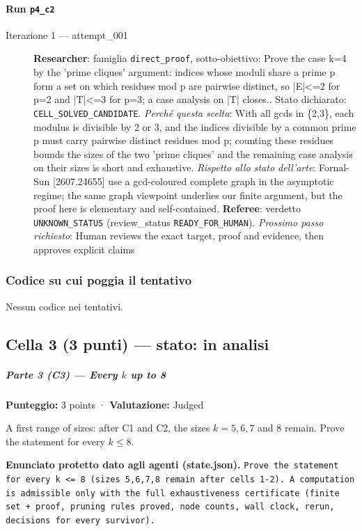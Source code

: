 \documentclass[11pt,a4paper]{article}
\begin{document}
\paragraph{Run \texttt{p4\_c2}}
\begin{description}
\item[Iterazione 1 — attempt\_001]
\textbf{Researcher}: famiglia \texttt{direct\_proof}, sotto-obiettivo: Prove the case k=4 by the 'prime cliques' argument: indices whose moduli share a prime p form a set on which residues mod p are pairwise distinct, so |E|\textless{}=2 for p=2 and |T|\textless{}=3 for p=3; a case analysis on |T| closes.. Stato dichiarato: \texttt{CELL\_SOLVED\_CANDIDATE}.
\emph{Perché questa scelta}: With all gcds in \{2,3\}, each modulus is divisible by 2 or 3, and the indices divisible by a common prime p must carry pairwise distinct residues mod p; counting these residues bounds the sizes of the two 'prime cliques' and the remaining case analysis on their sizes is short and exhaustive.
\emph{Rispetto allo stato dell'arte}: Fornal-Sun [2607.24655] use a gcd-coloured complete graph in the asymptotic regime; the same graph viewpoint underlies our finite argument, but the proof here is elementary and self-contained.
\textbf{Referee}: verdetto \texttt{UNKNOWN\_STATUS} (review\_status \texttt{READY\_FOR\_HUMAN}).
\emph{Prossimo passo richiesto}: Human reviews the exact target, proof and evidence, then approves explicit claims
\end{description}

\subsubsection{Codice su cui poggia il tentativo}
Nessun codice nei tentativi.

\subsection{Cella 3 (3 punti) — stato: in analisi}
\subparagraph{\texorpdfstring{Parte 3 (C3) --- Every \(k\) up to
8}{Parte 3 (C3) --- Every k up to 8}}\label{parte-3-c3-every-k-up-to-8}

\textbf{Punteggio:} 3 points · \textbf{Valutazione:} Judged

A first range of sizes: after C1 and C2, the sizes \(k = 5, 6, 7\) and
\(8\) remain. Prove the statement for every \(k \le 8\).

\textbf{Enunciato protetto dato agli agenti (state.json).} \texttt{Prove the statement for every k \textless{}= 8 (sizes 5,6,7,8 remain after cells 1-2). A computation is admissible only with the full exhaustiveness certificate (finite set + proof, pruning rules proved, node counts, wall clock, rerun, decisions for every survivor).}
\end{document}
